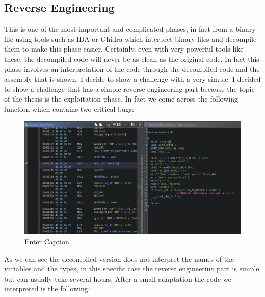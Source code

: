     \subsection{Reverse Engineering}
    This is one of the most important and complicated phases, in fact from a binary file using tools such as IDA or Ghidra which interpret binary files and decompile them to make this phase easier.\newline
    Certainly, even with very powerful tools like these, the decompiled code will never be as clean as the original code.\newline
    In fact this phase involves an interpretation of the code through the decompiled code and the assembly that is shown.
    I decide to show a challenge with a very simple.
    I decided to show a challenge that has a simple reverse engineering part because the topic of the thesis is the exploitation phase.\newline
    In fact we come across the following function which contains two critical bugs:\newline
    \clearpage
    \begin{figure}[htbp]
        \centering
        \includegraphics[width=0.9\linewidth]{Images/terminator_rev.png}
        \caption{Enter Caption}
        \label{fig:enter-label}
    \end{figure}
    As we can see the decompiled version does not interpret the names of the variables and the types, in this specific case the reverse engineering part is simple but can usually take several hours.\newline
    After a small adaptation the code we interpreted is the following:\newline

